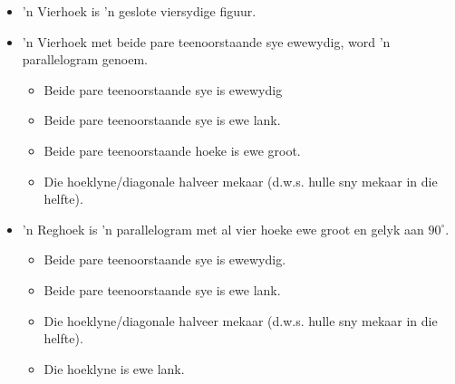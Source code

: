 \begin{itemize}[noitemsep]
\item ’n Vierhoek is ’n geslote viersydige figuur.
\item ’n Vierhoek met beide pare teenoorstaande sye ewewydig, word ’n parallelogram genoem.
\begin{itemize}
\item Beide pare teenoorstaande sye is ewewydig
\item Beide pare teenoorstaande sye is ewe lank.
\item Beide pare teenoorstaande hoeke is ewe groot.
\item Die hoeklyne/diagonale halveer mekaar (d.w.s. hulle sny mekaar in die helfte).
\end{itemize}
\item ’n Reghoek is ’n parallelogram met al vier hoeke ewe groot en gelyk aan $90^\circ$.
\begin{itemize}
\item Beide pare teenoorstaande sye is ewewydig.
\item Beide pare teenoorstaande sye is ewe lank.
\item Die hoeklyne/diagonale halveer mekaar (d.w.s. hulle sny mekaar in die helfte).
\item Die hoeklyne is ewe lank.


\end{itemize}
\end{itemize}
